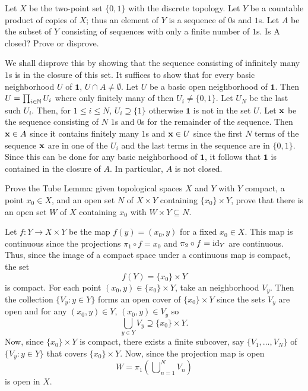 \begin{problem}
  Let \(X\) be the two-point set \(\{0,1\}\) with the discrete
  topology. Let \(Y\) be a countable product of copies of \(X\); thus an
  element of \(Y\) is a sequence of \(0\)s and \(1\)s.  Let \(A\) be the
  subset of \(Y\) consisting of sequences with only a finite number of
  \(1\)s. Is A closed?  Prove or disprove.
\end{problem}
\begin{solution}
  We shall disprove this by showing that the sequence consisting of
  infinitely many \(1\)s is in the closure of this set. It suffices to show
  that for every basic neighborhood \(U\) of \(\mathbf{1}\),
  \(U\cap A\neq\emptyset\). Let \(U\) be a basic open neighborhood of
  \(\mathbf{1}\). Then \(U=\prod_{i\in\mathbb{N}} U_i\) where only finitely many
  of then \(U_i\neq \{0,1\}\). Let \(U_N\) be the last such \(U_i\). Then,
  for \(1\leq i\leq N\), \(U_i\supseteq\{1\}\) otherwise \(\mathbf{1}\) is
  not in the set \(U\). Let \(\mathbf{x}\) be the sequence consisting of \(N\)
  \(1\)s and \(0\)s for the remainder of the sequence. Then \(\mathbf{x}\in A\)
  since it contains finitely many \(1\)s and \(\mathbf{x}\in U\) since the first
  \(N\) terms of the sequence \(\mathbf{x}\) are in one of the \(U_i\) and the
  last terms in the sequence are in \(\{0,1\}\). Since this can be done for
  any basic neighborhood of \(\mathbf{1}\), it follows that \(\mathbf{1}\)
  is contained in the closure of \(A\). In particular, \(A\) is not
  closed.
\end{solution}

\begin{problem}
  Prove the Tube Lemma: given topological spaces \(X\) and \(Y\) with \(Y\)
  compact, a point \(x_0\in X\), and an open set \(N\) of \(X\times Y\)
  containing \(\{x_0\}\times Y\), prove that there is an open set \(W\) of
  \(X\) containing \(x_0\) with \(W\times Y\subseteq N\).
\end{problem}
\begin{solution}
  Let \(f\colon Y\to X\times Y\) be the map \(f(y)=(x_0,y)\) for a fixed
  \(x_0\in X\). This map is continuous since the projections
  \(\pi_1\circ f=x_0\) and \(\pi_2\circ f=\operatorname{id}_Y\) are continuous. Thus,
  since the image of a compact space under a continuous map is compact, the
  set
  \[
    f(Y)=\{x_0\}\times Y
  \]
  is compact. For each point \((x_0,y)\in \{x_0\}\times Y\), take an
  neighborhood \(V_y\). Then the collection \(\{V_y:y\in Y\}\) forms an
  open cover of \(\{x_0\}\times Y\) since the sets \(V_y\) are open and for
  any \((x_0,y)\in Y\), \((x_0,y)\in V_y\) so
  \[
    \bigcup_{y\in Y}V_y\supseteq \{x_0\}\times Y.
  \]
  Now, since \(\{x_0\}\times Y\) is compact, there exists a finite
  subcover, say \(\{V_1,\dotsc,V_N\}\) of \(\{V_y:y\in Y\}\) that covers
  \(\{x_0\}\times Y\). Now, since the projection map is open
  \[
    W=\pi_1\left(\bigcup\nolimits_{n=1}^NV_n\right)
  \]
  is open in \(X\).
\end{solution}

